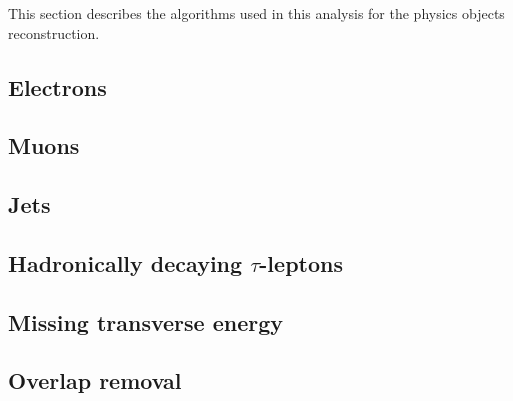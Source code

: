 This section describes the  algorithms used in this analysis for the physics objects reconstruction. 

\subsection{Electrons}
\label{subsec:electrons}



\subsection{Muons}
\label{subsec:muons}



\subsection{Jets}
\label{subsec:jets}



\subsection{Hadronically decaying $\tau$-leptons}
\label{subsec:taus}



\subsection{Missing transverse energy}
\label{subsec:met}



\subsection{Overlap removal}
\label{subsec:overlap}



